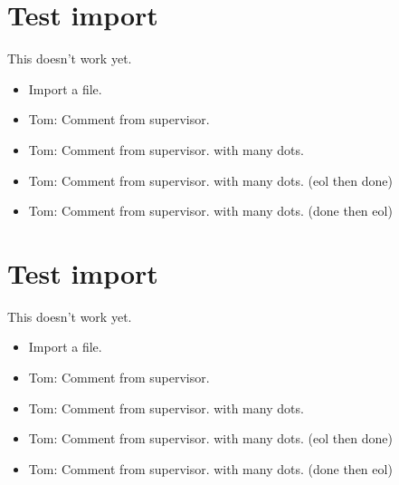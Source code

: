 \chapter{Test import}
\label{autosec:8}
This doesn't work yet.
    \begin{itemize}[noitemsep]
        \item {\color{red}Import a file.}
        \item {\color{WildStrawberry}Tom: Comment from supervisor.}
        \item {\color{WildStrawberry}Tom: Comment from supervisor. with many dots.}
        \item {\color{Gray}Tom: Comment from supervisor. with many dots. (eol then done)}
        \item {\color{Gray}Tom: Comment from supervisor. with many dots. (done then eol)}
    \end{itemize}
\chapter{Test import}
\label{autosec:9}
This doesn't work yet.
    \begin{itemize}[noitemsep]
        \item {\color{red}Import a file.}
        \item {\color{WildStrawberry}Tom: Comment from supervisor.}
        \item {\color{WildStrawberry}Tom: Comment from supervisor. with many dots.}
        \item {\color{Gray}Tom: Comment from supervisor. with many dots. (eol then done)}
        \item {\color{Gray}Tom: Comment from supervisor. with many dots. (done then eol)}
    \end{itemize}

